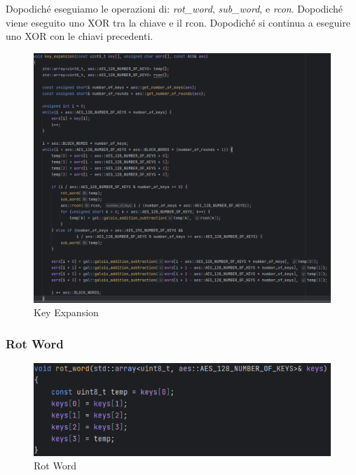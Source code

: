 \textsf{\small Dopodiché eseguiamo le operazioni di: \emph{rot\_word}, \emph{sub\_word}, e \emph{rcon}. Dopodiché viene eseguito uno XOR tra la chiave e il rcon. Dopodiché si continua a eseguire uno XOR con le chiavi precedenti.}


\begin{figure}[H]
	\centering
	\includegraphics[width=1\textwidth, height=1\textheight, keepaspectratio]{./images/code/cpp/key_expansion/key_expansion.PNG}
	\caption{Key Expansion}
	\label{fig:key_expansion_code}
\end{figure}

\subsubsection{Rot Word}

\begin{figure}[H]
	\centering
	\includegraphics[width=1\textwidth, height=1\textheight, keepaspectratio]{./images/code/cpp/key_expansion/rot_word.PNG}
	\caption{Rot Word}
	\label{fig:rot_word}
\end{figure}

